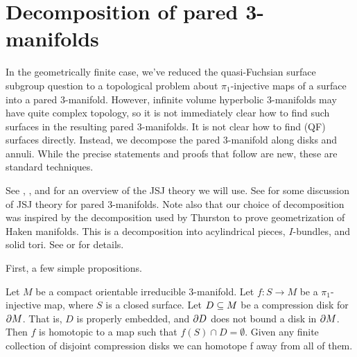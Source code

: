 \section{Decomposition of pared 3-manifolds}

In the geometrically finite case, we've reduced the quasi-Fuchsian surface
subgroup question to a topological problem about $\pi_1$-injective maps of
a surface into a pared 3-manifold. However, infinite volume hyperbolic
3-manifolds may have quite complex topology, so it is not immediately clear how
to find such surfaces in the resulting pared 3-manifolds. It is not clear how
to find (QF) surfaces directly. Instead, we decompose the pared 3-manifold
along disks and annuli. While the precise statements and proofs that follow are
new, these are standard techniques.

See \cite{Ja}, \cite{JacoShalen}, and \cite{Johannson} for an overview of the
JSJ theory we will use.  See \cite{CMc} for some discussion of JSJ theory for
pared 3-manifolds.  Note also that our choice of decomposition was inspired by
the decomposition used by Thurston to prove geometrization of Haken manifolds.
This is a decomposition into acylindrical pieces, $I$-bundles, and solid tori.
See \cite{Mo} or \cite{ThurstonIII} for details.

First, a few simple propositions.

\begin{prop}

Let $M$ be a compact orientable irreducible 3-manifold. Let $f \colon S \to M$
be a $\pi_1$-injective map, where $S$ is a closed surface.  Let $D \subseteq M$ be
a compression disk for $\partial M$. That is, $D$ is properly embedded, and $\partial D$
does not bound a disk in $\partial M$. Then $f$ is homotopic to a map such that
$f(S) \cap D = \emptyset$. Given any finite collection of disjoint compression
disks we can homotope f away from all of them.

\end{prop}

